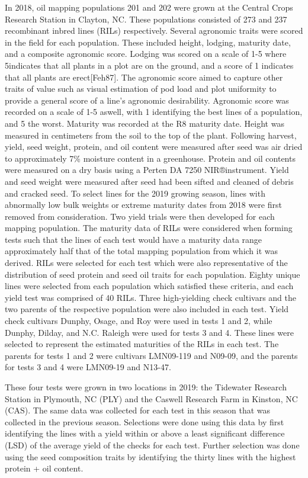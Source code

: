 \documentclass[Agronomy,article,submit,moreauthors,pdftex]{mdpi}
\begin{document}
In 2018, oil mapping populations 201 and 202 were grown at the Central
Crops Research Station in Clayton, NC. These populations consisted of
273 and 237 recombinant inbred lines (RILs) respectively. Several
agronomic traits were scored in the field for each population. These
included height, lodging, maturity date, and a composite agronomic
score. Lodging was scored on a scale of 1-5 where 5indicates that all
plants in a plot are on the ground, and a score of 1 indicates that all
plants are erect{[}Feh87{]}. The agronomic score aimed to capture other
traits of value such as visual estimation of pod load and plot
uniformity to provide a general score of a line's agronomic
desirability. Agronomic score was recorded on a scale of 1-5 aswell,
with 1 identifying the best lines of a population, and 5 the worst.
Maturity was recorded at the R8 maturity date. Height was measured in
centimeters from the soil to the top of the plant. Following harvest,
yield, seed weight, protein, and oil content were measured after seed
was air dried to approximately 7\% moisture content in a greenhouse.
Protein and oil contents were measured on a dry basis using a Perten DA
7250 NIR®instrument. Yield and seed weight were measured after seed had
been sifted and cleaned of debris and cracked seed. To select lines for
the 2019 growing season, lines with abnormally low bulk weights or
extreme maturity dates from 2018 were first removed from consideration.
Two yield trials were then developed for each mapping population. The
maturity data of RILs were considered when forming tests such that the
lines of each test would have a maturity data range approximately half
that of the total mapping population from which it was derived. RILs
were selected for each test which were also representative of the
distribution of seed protein and seed oil traits for each population.
Eighty unique lines were selected from each population which satisfied
these criteria, and each yield test was comprised of 40 RILs. Three
high-yielding check cultivars and the two parents of the respective
population were also included in each test. Yield check cultivars
Dunphy, Osage, and Roy were used in tests 1 and 2, while Dunphy, Dilday,
and N.C. Raleigh were used for tests 3 and 4. These lines were selected
to represent the estimated maturities of the RILs in each test. The
parents for tests 1 and 2 were cultivars LMN09-119 and N09-09, and the
parents for tests 3 and 4 were LMN09-19 and N13-47.

These four tests were grown in two locations in 2019: the Tidewater
Research Station in Plymouth, NC (PLY) and the Caswell Research Farm in
Kinston, NC (CAS). The same data was collected for each test in this
season that was collected in the previous season. Selections were done
using this data by first identifying the lines with a yield within or
above a least significant difference (LSD) of the average yield of the
checks for each test. Further selection was done using the seed
composition traits by identifying the thirty lines with the highest
protein + oil content.
\end{document}
